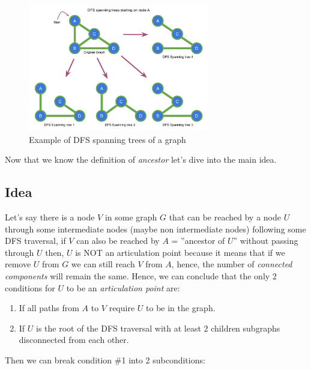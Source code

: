 \documentclass[twoside, openany]{book}
\begin{document}
\begin{figure}[H]
  \centering
  \includegraphics[width=0.7\textwidth]{"Images/Graph Theory/Articulation Points And Bridges/g2.pdf"}
  \caption{Example of DFS spanning trees of a graph}
  \label{fig:apb_g2}
\end{figure}

\noindent
Now that we know the definition of \textit{ancestor} let's dive into the main idea.

\subsection*{Idea}

Let's say there is a node $V$ in some graph $G$ that can be reached by a node $U$ through some
intermediate nodes (maybe non intermediate nodes) following some DFS traversal, if $V$ can also be
reached by $A$ = ''ancestor of $U$'' without passing through $U$ then, $U$ is NOT an articulation point
because it means that if we remove $U$ from $G$ we can still reach $V$ from $A$, hence, the number of
\textit{connected components} will remain the same. Hence, we can conclude that the only 2 conditions for
$U$ to be an \textit{articulation point} are:\\

\begin{enumerate}
  \item If all paths from $A$ to $V$ require $U$ to be in the graph.
  \item If $U$ is the root of the DFS traversal with at least 2 children subgraphs disconnected from each other.
\end{enumerate}

\noindent
Then we can break condition \#1 into 2 subconditions:
\end{document}
